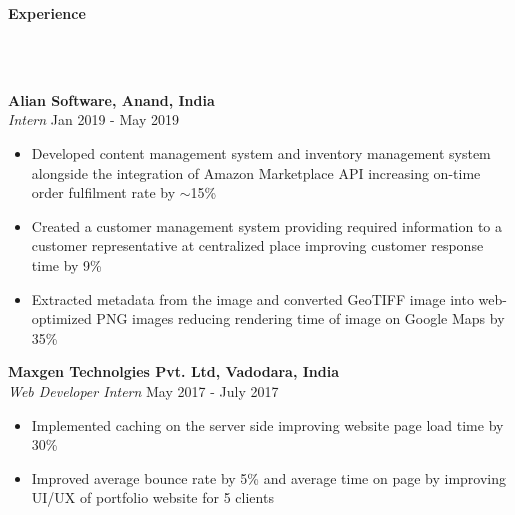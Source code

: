 \documentclass[]{article}
\newcommand{\lineunder} {
    \vspace*{-8pt} \\
    \hrulefill \\
}
\newcommand{\header} [1] {
    {\vspace*{6pt} \fontsize{12}{12}\selectfont \textbf{#1}}
     \lineunder
}
\begin{document}
\header{Experience}
\vspace{1mm}

\hspace{1mm}
\textbf{Alian Software, Anand, India}\\
\hspace{1mm}
\textit{Intern} \hfill Jan 2019 - May 2019\\
\vspace{-2mm}
\begin{itemize}
    \setlength\itemsep{0.2mm}
    \item Developed content management system and inventory management system alongside the integration of Amazon Marketplace API increasing on-time order fulfilment rate by $\sim$15\%
	\item Created a customer management system providing required information to a customer representative at centralized place improving customer response time by 9\%
	\item Extracted metadata from the image and converted GeoTIFF image into web-optimized PNG images reducing rendering time of image on Google Maps by 35\%
\end{itemize}
\hspace{1mm}
\textbf{Maxgen Technolgies Pvt. Ltd, Vadodara, India}\\
\hspace{1mm}
\textit{Web Developer Intern} \hfill May 2017 - July 2017\\
\vspace{-2mm}
\begin{itemize}
    \setlength\itemsep{0.2mm}
	\item Implemented caching on the server side improving website page load time by 30\% 
	\item Improved average bounce rate by 5\% and average time on page by improving UI/UX of portfolio website for 5 clients
\end{itemize}


\end{document}
